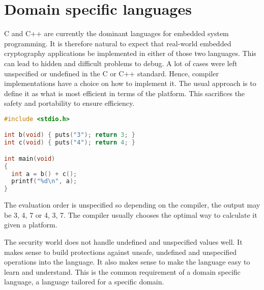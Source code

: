 \filbreak

\section{Domain specific languages}

C and C++ are currently the dominant languages for embedded system
programming. It is therefore natural to expect that real-world
embedded cryptography applications be implemented in either of those
two languages. This can lead to hidden and difficult problems to
debug. A lot of cases were left unspecified or undefined in the C or
C++ standard. Hence, compiler implementations have a choice on how to
implement it. The usual approach is to define it as what is most
efficient in terms of the platform. This sacrifices the safety and
portability to ensure efficiency.

\filbreak

\begin{lstlisting}[language=C]
#include <stdio.h>

int b(void) { puts("3"); return 3; }
int c(void) { puts("4"); return 4; }

int main(void)
{
  int a = b() + c();
  printf("%d\n", a);
}
\end{lstlisting}

The evaluation order is unspecified so depending on the compiler, the
output may be 3, 4, 7 or 4, 3, 7. The compiler usually chooses the
optimal way to calculate it given a platform.

The security world does not handle undefined and unspecified values
well. It makes sense to build protections against unsafe, undefined
and unspecified operations into the language. It also makes sense to
make the language easy to learn and understand. This is the common
requirement of a domain specific language, a language tailored for a
specific domain.

